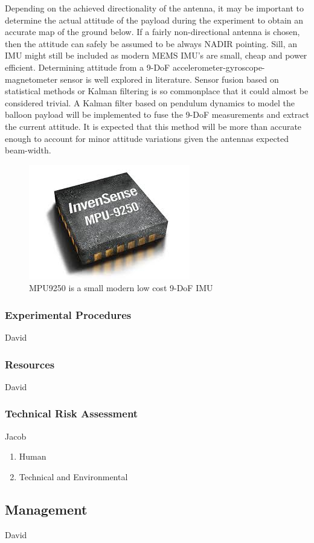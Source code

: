 \documentclass[12pt]{article}
\begin{document}
Depending on the achieved directionality of the antenna, it may be important to determine the actual attitude of the payload during the experiment to obtain an accurate map of the ground below. If a fairly non-directional antenna is chosen, then the attitude can safely be assumed to be always NADIR pointing. Sill, an IMU might still be included as modern MEMS IMU's are small, cheap and power efficient. Determining attitude from a 9-DoF accelerometer-gyroscope-magnetometer sensor is well explored in literature. Sensor fusion based on statistical methods or Kalman filtering is so commonplace that it could almost be considered trivial. A Kalman filter based on pendulum dynamics to model the balloon payload will be implemented to fuse the 9-DoF measurements and extract the current attitude. It is expected that this method will be more than accurate enough to account for minor attitude variations given the antennas expected beam-width.

\begin{figure}[h!]
	\centering
	\includegraphics[width=.4\linewidth]{Figures/IMU.jpg}
	\caption{MPU9250 is a small modern low cost 9-DoF IMU}
	\label{fig:imu}
\end{figure}

\subsubsection{Experimental Procedures}
David
\subsubsection{Resources}
David
\subsubsection{Technical Risk Assessment}
Jacob
\begin{enumerate}
\item Human
\cite{omar_el-kassaby_abdelghaffar_2017}
\item Technical and Environmental
\end{enumerate}
\subsection{Management}
David
\end{document}
